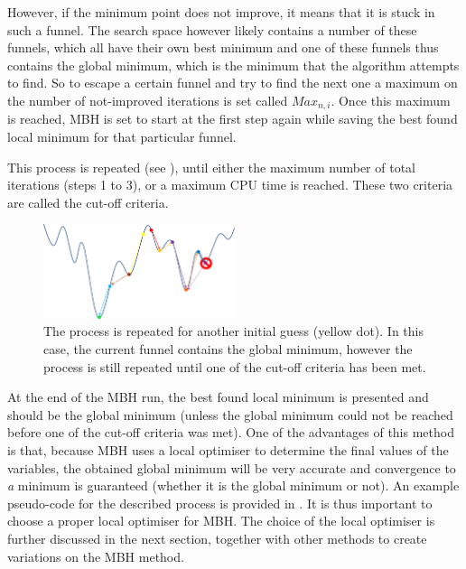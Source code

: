 However, if the minimum point does not improve, it means that it is stuck in such a funnel. The search space however likely contains a number of these funnels, which all have their own best minimum and one of these funnels thus contains the global minimum, which is the minimum that the algorithm attempts to find. So to escape a certain funnel and try to find the next one a maximum on the number of not-improved iterations is set called $Max_{n,i}$. Once this maximum is reached, \ac{MBH} is set to start at the first step again while saving the best found local minimum for that particular funnel. 


This process is repeated (see ), until either the maximum number of total iterations (steps 1 to 3), or a maximum CPU time is reached. These two criteria are called the cut-off criteria. 

\begin{figure}[!ht]
\centering
\includegraphics[width=0.5\textwidth]{figures/optimisation/mbh_explained_5.png}
\caption{The process is repeated for another initial guess (yellow dot). In this case, the current funnel contains the global minimum, however the process is still repeated until one of the cut-off criteria has been met.}
\label{fig:mbh_explained_5}
\end{figure}

At the end of the \ac{MBH} run, the best found local minimum is presented and should be the global minimum (unless the global minimum could not be reached before one of the cut-off criteria was met). One of the advantages of this method is that, because \ac{MBH} uses a local optimiser to determine the final values of the variables, the obtained global minimum will be very accurate and convergence to \textit{a} minimum is guaranteed (whether it is the global minimum or not). An example pseudo-code for the described process is provided in \cite{englander2014tuning}. It is thus important to choose a proper local optimiser for \ac{MBH}. The choice of the local optimiser is further discussed in the next section, together with other methods to create variations on the \ac{MBH} method. 




